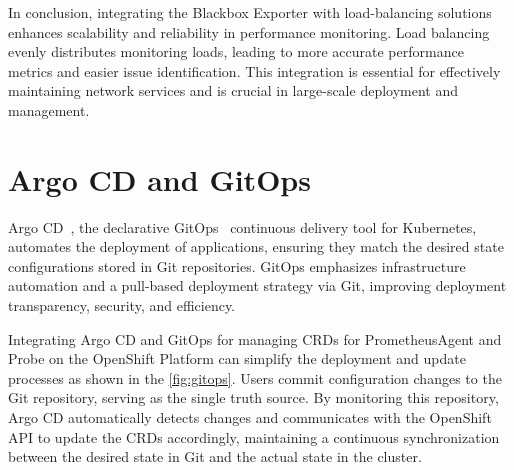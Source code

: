 In conclusion, integrating the Blackbox Exporter with load-balancing solutions enhances scalability and reliability in performance monitoring. Load balancing evenly distributes monitoring loads, leading to more accurate performance metrics and easier issue identification. This integration is essential for effectively maintaining network services and is crucial in large-scale deployment and management. 

\section{Argo CD and GitOps}

Argo CD~\parencite{ArgoCDDeclarative}, the declarative GitOps~\parencite{WeaveworksWeavegitopsWeave} continuous delivery tool for Kubernetes, automates the deployment of applications, ensuring they match the desired state configurations stored in Git repositories. GitOps emphasizes infrastructure automation and a pull-based deployment strategy via Git, improving deployment transparency, security, and efficiency. 

Integrating Argo CD and GitOps for managing \ac{CRD}s for PrometheusAgent and Probe on the OpenShift Platform can simplify the deployment and update processes as shown in the \autoref{fig:gitops}. Users commit configuration changes to the Git repository, serving as the single truth source. By monitoring this repository, Argo CD automatically detects changes and communicates with the OpenShift API to update the \ac{CRD}s accordingly, maintaining a continuous synchronization between the desired state in Git and the actual state in the cluster. 


